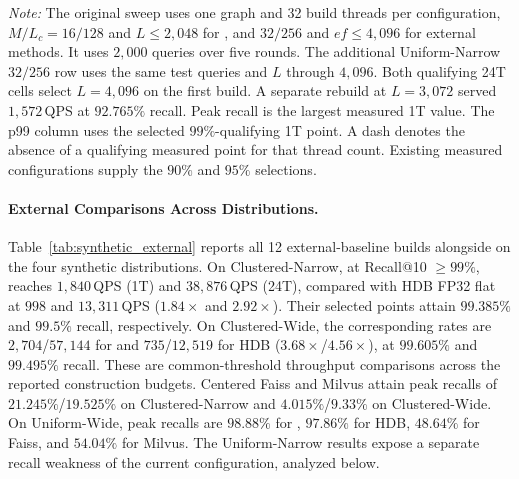 \begin{table}[t]
  \centering
  \caption{Measured comparison on all four synthetic distributions (1M vectors, 512D, Zen~4). Each QPS column selects the fastest measured configuration reaching its Recall@10 threshold. Panels (a) and (b) report one and 24 query threads.}
  \label{tab:synthetic_external}
  \footnotesize
  \setlength{\tabcolsep}{2pt}
  
  \par\vspace{2pt}
  {\footnotesize \textit{Note:} The original sweep uses one graph and 32 build threads per configuration, $M/L_c=16/128$ and $L\le2{,}048$ for \rquiver{}, and $32/256$ and $ef\le4{,}096$ for external methods. It uses $2{,}000$ queries over five rounds. The additional Uniform-Narrow $32/256$ row uses the same test queries and $L$ through $4{,}096$. Both qualifying 24T cells select $L=4{,}096$ on the first build. A separate rebuild at $L=3{,}072$ served $1{,}572$\,QPS at $92.765\%$ recall. Peak recall is the largest measured 1T value. The p99 column uses the selected $99\%$-qualifying 1T point. A dash denotes the absence of a qualifying measured point for that thread count. Existing measured configurations supply the $90\%$ and $95\%$ selections.}
\end{table}

\paragraph{External Comparisons Across Distributions.}
Table~\ref{tab:synthetic_external} reports all 12 external-baseline builds alongside \rquiver{} on the four synthetic distributions. On {Clustered-Narrow}, at Recall@10 $\ge99\%$, \rquiver{} reaches $1{,}840$\,QPS (1T) and $38{,}876$\,QPS (24T), compared with HDB FP32 flat at $998$ and $13{,}311$\,QPS ($1.84\times$ and $2.92\times$). Their selected points attain $99.385\%$ and $99.5\%$ recall, respectively. On {Clustered-Wide}, the corresponding rates are $2{,}704$/$57{,}144$ for \rquiver{} and $735$/$12{,}519$ for HDB ($3.68\times$/$4.56\times$), at $99.605\%$ and $99.495\%$ recall. These are common-threshold throughput comparisons across the reported construction budgets.
Centered Faiss and Milvus attain peak recalls of $21.245\%$/$19.525\%$ on {Clustered-Narrow} and $4.015\%$/$9.33\%$ on {Clustered-Wide}. On {Uniform-Wide}, peak recalls are $98.88\%$ for \rquiver{}, $97.86\%$ for HDB, $48.64\%$ for Faiss, and $54.04\%$ for Milvus. The {Uniform-Narrow} results expose a separate recall weakness of the current \rquiver{} configuration, analyzed below.

